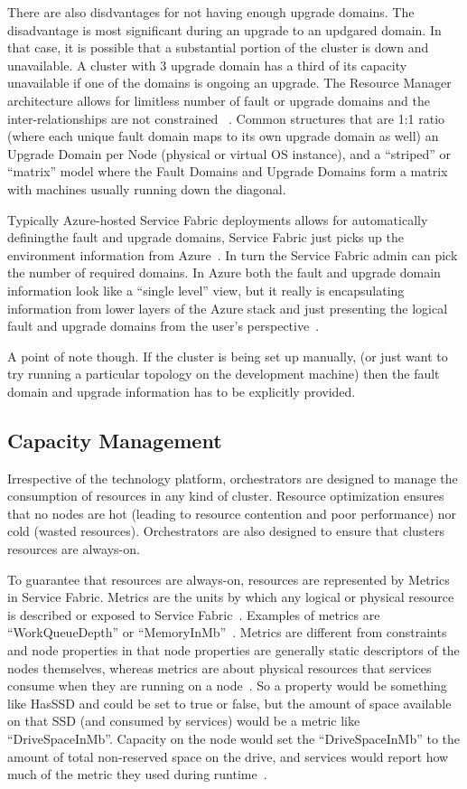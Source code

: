 There are also disdvantages for not having enough upgrade domains.
The disadvantage is most significant during an upgrade to an updgared
domain. In that case, it is possible that a substantial portion
of the cluster is down and unavailable. A cluster with 3 upgrade domain 
has a third of its
capacity unavailable if one of the domains is ongoing an upgrade. 
The Resource Manager architecture allows for limitless number of fault or 
upgrade domains
and the inter-relationships are not constrained
~\cite{hid-sp18-501-description}. Common structures that 
are 1:1 ratio (where each
unique fault domain maps to its own upgrade domain as well) an Upgrade
Domain per Node (physical or virtual OS instance), and a ``striped'' or
``matrix'' model where the Fault Domains and Upgrade Domains form a
matrix with machines usually running down the diagonal.

Typically Azure-hosted Service Fabric deployments allows for
automatically definingthe fault and upgrade domains, Service Fabric
just picks up the environment information from
Azure~\cite{hid-sp18-501-fig2and3}. In turn the Service Fabric admin
can pick the number of required domains. In Azure both the fault and
upgrade domain information look like a ``single level'' view, but it
really is encapsulating information from lower layers of the Azure
stack and just presenting the logical fault and upgrade domains from
the user's perspective~\cite{hid-sp18-501-fig2and3}.

A point of note though. If the cluster is being set up manually, (or
just want to try running a particular topology on the development
machine) then the fault domain and upgrade information has to be
explicitly provided.

\subsection{Capacity Management}
Irrespective of the technology platform, orchestrators are designed to
manage the consumption of resources in any kind of cluster. Resource
optimization ensures that no nodes are hot (leading to resource
contention and poor performance) nor cold (wasted
resources). Orchestrators are also designed to ensure that clusters
resources are always-on.

To guarantee that resources are always-on, resources are represented
by Metrics in Service Fabric. Metrics are the units by which any
logical or physical resource is described or exposed to Service
Fabric~\cite{hid-sp18-501-fig2and3}. Examples of metrics are
``WorkQueueDepth'' or ``MemoryInMb''~\cite{hid-sp18-501-description}. 
Metrics are different from
constraints and node properties in that node properties are generally
static descriptors of the nodes themselves, whereas metrics are about
physical resources that services consume when they are running on a
node~\cite{hid-sp18-501-fig2and3}.  So a property would be something
like HasSSD and could be set to true or false, but the amount of space
available on that SSD (and consumed by services) would be a metric
like ``DriveSpaceInMb''. Capacity on the node would set the
``DriveSpaceInMb'' to the amount of total non-reserved space on the
drive, and services would report how much of the metric they used
during runtime~\cite{hid-sp18-501-fig2and3}.

